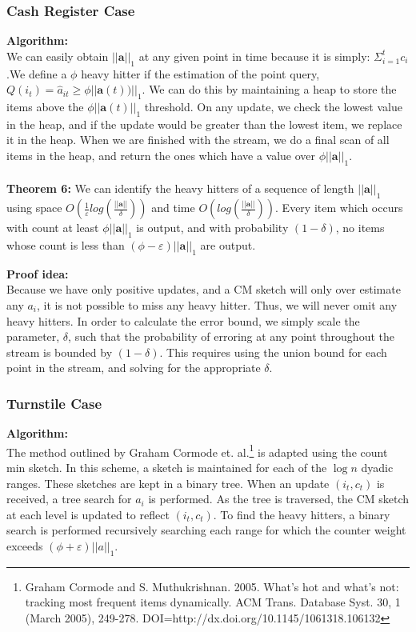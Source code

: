 \documentclass[11pt]{article}
\begin{document}
{\subsubsection{Cash Register Case}
\textbf{Algorithm:}\\
We can easily obtain $||\bm{a}||_1$ at any given point in time because it is simply: $\Sigma_{i=1}^t c_i$.We define a $\phi$ heavy hitter if the estimation of the point query, $Q(i_t) =  \hat a_{it} \geq \phi ||\bm{a}(t))||_1$. We can do this by maintaining a heap to store the items above the $\phi||\bm{a}(t)||_1$ threshold. On any update, we check the lowest value in the heap, and if the update would be greater than the lowest item, we replace it in the heap. When we are finished with the stream, we do a final scan of all items in the heap, and return the ones which have a value over $\phi||\bm{a}||_1$.\\\\
\textbf{Theorem 6: } We can identify the heavy hitters of a sequence of length $||\bm{a}||_1$ using space $O(\frac{1}{\varepsilon}log(\frac{||\bm{a}||}{\delta}))$ and time $O(log(\frac{||\bm{a}||}{\delta}))$. Every item which occurs with count at least
$\phi ||\bm{a}||_1$ is output, and with probability $(1-\delta)$, no items whose count is less than $(\phi - \varepsilon)||\bm{a}||_1$ are output.

\textbf{Proof idea:}\\
Because we have only positive updates, and a CM sketch will only over estimate any $a_i$,
it is not possible to miss any heavy hitter. Thus, we will never omit any heavy
hitters. In order to calculate the error bound, we simply scale the parameter, $\delta$, such that the probability of erroring at any point throughout the stream is bounded by $(1-\delta)$. This requires using the union bound for each point in the stream, and solving for the appropriate $\delta$.

\subsubsection{Turnstile Case}
\textbf{Algorithm:}\\
The method outlined by Graham Cormode et. al.\footnote{Graham Cormode and S. Muthukrishnan. 2005. What's hot and what's not: tracking most frequent items dynamically. ACM Trans. Database Syst. 30, 1 (March 2005), 249-278. DOI=http://dx.doi.org/10.1145/1061318.106132} is adapted using the count min sketch. In this scheme, a sketch is maintained for each of the $\log n$ dyadic ranges. These sketches are kept in a binary tree. When an update $(i_t, c_t)$ is received, a tree search for $a_i$ is performed. As the tree is traversed, the CM sketch at each level is updated to reflect $(i_t, c_t)$. To find the heavy hitters, a binary search is performed recursively searching each range for which the counter weight exceeds $(\phi + \varepsilon)||a||_1$.

}
\end{document}
